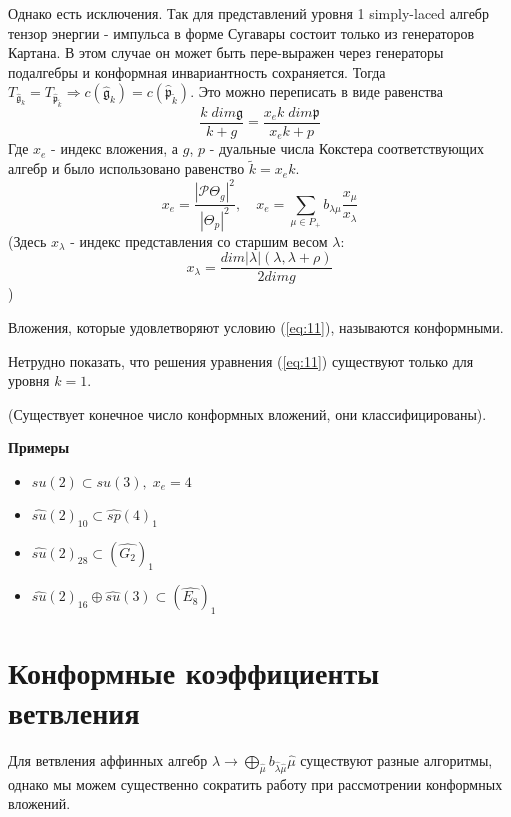 \documentclass[a4paper,12pt]{article}
\theoremstyle{definition} \newtheorem{Def}{Definition}
\begin{document}
Однако есть исключения. Так для представлений уровня 1 simply-laced алгебр тензор энергии - импульса в форме Сугавары состоит только из генераторов Картана. В этом случае он может быть пере-выражен через генераторы подалгебры и конформная инвариантность сохраняется. Тогда $T_{\hat{\mathfrak{g}}_k}=T_{\hat{\mathfrak{p}}_{\tilde k}}\Rightarrow c(\hat{\mathfrak{g}}_k)=c(\hat{\mathfrak{p}}_{\tilde k})$. Это можно переписать в виде равенства
\begin{equation}
  \label{eq:11}
  \frac{k\;dim\mathfrak{g}}{k+g}=\frac{x_e k\; dim\mathfrak{p}}{x_ek+p}
\end{equation}
Где $x_e$ - индекс вложения, а $g$, $p$ - дуальные числа Кокстера соответствующих алгебр и было использовано равенство $\tilde k=x_e k$.
\begin{equation}
  \label{eq:12}
  x_e=\frac{\left|\mathcal{P}\Theta_g\right|^2}{\left| \Theta_p\right|^2},\quad
  x_e=\sum_{\mu\in P_{+}}b_{\lambda\mu}\frac{x_{\mu}}{x_{\lambda}}
\end{equation}
(Здесь $x_{\lambda}$ - индекс представления со старшим весом $\lambda$:
\begin{equation}
  \label{eq:13}
  x_{\lambda}=\frac{dim \left|\lambda\right|(\lambda,\lambda+\rho)}{2 dim g}
\end{equation})

Вложения, которые удовлетворяют условию (\ref{eq:11}), называются конформными.

Нетрудно показать, что решения уравнения (\ref{eq:11}) существуют только для уровня $k=1$.

(Существует конечное число конформных вложений, они классифицированы).

{\bf Примеры}
\begin{itemize}
\item $su(2)\subset su(3),\; x_e=4$
\item $\hat{su}(2)_{10}\subset\hat{sp}(4)_1$
\item $\hat{su}(2)_{28}\subset(\hat{G_2})_1$
\item $\hat{su}(2)_{16}\oplus\hat{su}(3)\subset (\hat{E_8})_1$
\end{itemize}

\section{Конформные коэффициенты ветвления}
\label{sec:conformal-branching-rules}

Для ветвления аффинных алгебр $\hat{\lambda}\to \bigoplus_{\hat{\mu}}b_{\hat{\lambda}\hat{\mu}}\hat{\mu}$ существуют разные алгоритмы, однако мы можем существенно сократить работу при рассмотрении конформных вложений.
\end{document}
